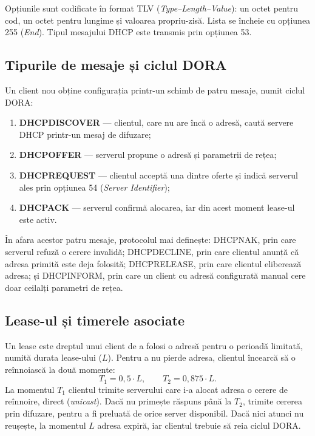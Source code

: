 \documentclass[conference]{IEEEtran}
\begin{document}
Opțiunile sunt codificate în format TLV (\textit{Type--Length--Value}): un octet pentru cod, un octet pentru lungime și valoarea propriu-zisă. Lista se încheie cu opțiunea 255 (\textit{End}). Tipul mesajului DHCP este transmis prin opțiunea 53.

\subsection{Tipurile de mesaje și ciclul DORA}
Un client nou obține configurația printr-un schimb de patru mesaje, numit ciclul DORA:
\begin{enumerate}
\item \textbf{DHCPDISCOVER} --- clientul, care nu are încă o adresă, caută servere DHCP printr-un mesaj de difuzare;
\item \textbf{DHCPOFFER} --- serverul propune o adresă și parametrii de rețea;
\item \textbf{DHCPREQUEST} --- clientul acceptă una dintre oferte și indică serverul ales prin opțiunea 54 (\textit{Server Identifier});
\item \textbf{DHCPACK} --- serverul confirmă alocarea, iar din acest moment lease-ul este activ.
\end{enumerate}

În afara acestor patru mesaje, protocolul mai definește: DHCPNAK, prin care serverul refuză o cerere invalidă; DHCPDECLINE, prin care clientul anunță că adresa primită este deja folosită; DHCPRELEASE, prin care clientul eliberează adresa; și DHCPINFORM, prin care un client cu adresă configurată manual cere doar ceilalți parametri de rețea.

\subsection{Lease-ul și timerele asociate}
Un lease este dreptul unui client de a folosi o adresă pentru o perioadă limitată, numită durata lease-ului ($L$). Pentru a nu pierde adresa, clientul încearcă să o reînnoiască la două momente:
\begin{equation}
T_1 = 0{,}5 \cdot L, \qquad T_2 = 0{,}875 \cdot L .\label{eq:timere}
\end{equation}
La momentul $T_1$ clientul trimite serverului care i-a alocat adresa o cerere de reînnoire, direct (\textit{unicast}). Dacă nu primește răspuns până la $T_2$, trimite cererea prin difuzare, pentru a fi preluată de orice server disponibil. Dacă nici atunci nu reușește, la momentul $L$ adresa expiră, iar clientul trebuie să reia ciclul DORA.
\end{document}
